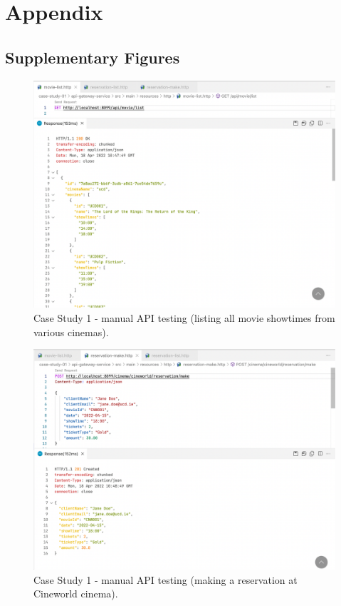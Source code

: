 \chapter{Appendix}

\section{Supplementary Figures}


\begin{figure}[H]
  \centering
  \includegraphics[width=1.0\linewidth]{./assets/images/case-study-01/cs01-manual-1.png}
  \caption{Case Study 1 - manual API testing (listing all movie showtimes from various cinemas).}
  \label{fig:cs01-manual-1}
\end{figure}

\begin{figure}[H]
  \centering
  \includegraphics[width=1.0\linewidth]{./assets/images/case-study-01/cs01-manual-2.png}
  \caption{Case Study 1 - manual API testing (making a reservation at Cineworld cinema).}
  \label{fig:cs01-manual-2}
\end{figure}

